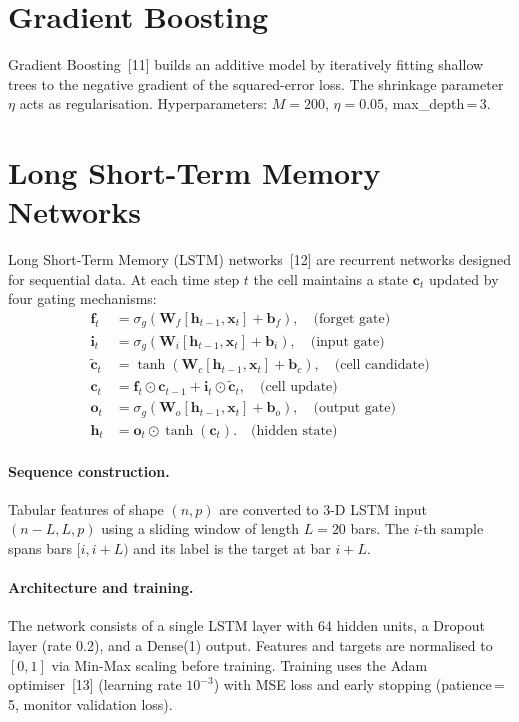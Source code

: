 \documentclass[12pt, a4paper, oneside]{report}
\theoremstyle{plain}
\theoremstyle{definition}
\theoremstyle{remark}
\begin{document}
\section{Gradient Boosting}

Gradient Boosting~[11] builds an additive model by iteratively fitting shallow
trees to the negative gradient of the squared-error loss.  The shrinkage
parameter $\eta$ acts as regularisation.
Hyperparameters: $M = 200$, $\eta = 0.05$, max\_depth\,=\,3.

\section{Long Short-Term Memory Networks}
\label{sec:lstm}

Long Short-Term Memory (LSTM) networks~[12] are recurrent networks designed
for sequential data.  At each time step $t$ the cell maintains a state
$\mathbf{c}_t$ updated by four gating mechanisms:
\begin{align}
  \mathbf{f}_t &= \sigma_g(\mathbf{W}_f[\mathbf{h}_{t-1}, \mathbf{x}_t] + \mathbf{b}_f),
    \quad \text{(forget gate)} \\
  \mathbf{i}_t &= \sigma_g(\mathbf{W}_i[\mathbf{h}_{t-1}, \mathbf{x}_t] + \mathbf{b}_i),
    \quad \text{(input gate)} \\
  \tilde{\mathbf{c}}_t &= \tanh(\mathbf{W}_c[\mathbf{h}_{t-1}, \mathbf{x}_t] + \mathbf{b}_c),
    \quad \text{(cell candidate)} \\
  \mathbf{c}_t &= \mathbf{f}_t \odot \mathbf{c}_{t-1} + \mathbf{i}_t \odot \tilde{\mathbf{c}}_t,
    \quad \text{(cell update)} \\
  \mathbf{o}_t &= \sigma_g(\mathbf{W}_o[\mathbf{h}_{t-1}, \mathbf{x}_t] + \mathbf{b}_o),
    \quad \text{(output gate)} \\
  \mathbf{h}_t &= \mathbf{o}_t \odot \tanh(\mathbf{c}_t).
    \quad \text{(hidden state)}
\end{align}

\paragraph{Sequence construction.}
Tabular features of shape $(n, p)$ are converted to 3-D LSTM input
$(n - L, L, p)$ using a sliding window of length $L = 20$ bars.  The
$i$-th sample spans bars $[i, i+L)$ and its label is the target at bar $i+L$.

\paragraph{Architecture and training.}
The network consists of a single LSTM layer with 64 hidden units, a Dropout
layer (rate 0.2), and a Dense(1) output.  Features and targets are normalised
to $[0,1]$ via Min-Max scaling before training.  Training uses the Adam
optimiser~[13] (learning rate $10^{-3}$) with MSE loss and early stopping
(patience\,=\,5, monitor validation loss).
\end{document}
